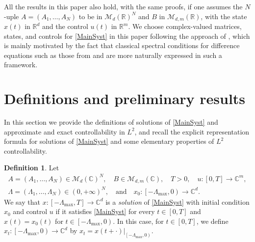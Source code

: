 \documentclass[JEP,XML,SOM,Unicode]{cedram}
\theoremstyle{plain}
\theoremstyle{definition}
\newtheorem{defi}[theo]{Definition}
\begin{document}
All the results in this paper also hold, with the same proofs, if one assumes the $N$\nobreakdash-uple $A = (A_1, \dots, A_N)$ to be in $\mathcal M_d(\mathbb R)^N$
and $B$ in $\mathcal M_{d, m}(\mathbb R)$, with the state $x(t)$ in $\mathbb R^d$ and the control $u(t)$ in $\mathbb R^m$. We choose complex-valued matrices, states, and controls for \eqref{MainSyst} in this paper following the approach of \cite{Chitour2016Stability}, which is mainly motivated by the fact that classical spectral conditions for difference equations such as those from \cite{Avellar1980Zeros, Henry1974Linear, Hale2002Strong} and \cite[Chap.\,9]{Hale1993Introduction} are more naturally expressed in such a framework.

\section{Definitions and preliminary results}
\label{SecPrevResults}

In this section we provide the definitions of solutions of \eqref{MainSyst} and approximate and exact controllability in $L^2$, and recall the explicit representation formula for solutions of \eqref{MainSyst} and some elementary properties of $L^2$ controllability.

\label{SecControlDelayWellPosed}

\begin{defi}
\label{DefiSolution}
Let
\begin{equation}\label{eq:DefiSolution}
\begin{gathered}
A = (A_1, \dots, A_N) \in \mathcal M_d(\mathbb C)^N,\quad B \in \mathcal M_{d, m}(\mathbb C),\quad T > 0,\quad
u: [0, T] \to \mathbb C^m,\\
\Lambda = (\Lambda_1, \dots, \Lambda_N) \in (0, +\infty)^N,\quad \text{and}\quad x_0: \left[-\Lambda_{\max}, 0\right) \to \mathbb C^d.
\end{gathered}
\end{equation}
We say that $x: \left[-\Lambda_{\max}, T\right] \to \mathbb C^d$ is a \emph{solution} of \eqref{MainSyst} with initial condition $x_0$ and control $u$ if it satisfies \eqref{MainSyst} for every $t \in [0, T]$ and $x(t) = x_0(t)$ for $t \in \left[-\Lambda_{\max}, 0\right)$. In this case, for $t \in [0, T]$, we define $x_t: \left[-\Lambda_{\max}, 0\right) \to \mathbb C^d$ by $x_t = x(t + \cdot)|_{\left[-\Lambda_{\max}, 0\right)}$.
\end{defi}
\end{document}
